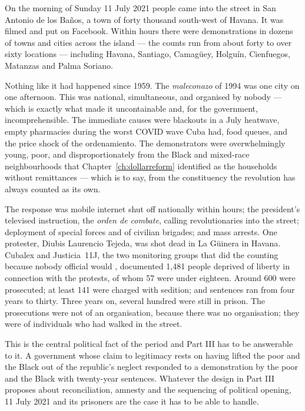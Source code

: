 On the morning of Sunday 11 July 2021 people came into the street in San
Antonio de los Ba\~nos, a town of forty thousand south-west of Havana. It was
filmed and put on Facebook. Within hours there were demonstrations in dozens of
towns and cities across the island --- the counts run from about forty to over
sixty locations --- including Havana, Santiago, Camag\"uey, Holgu\'in,
Cienfuegos, Matanzas and Palma Soriano.\unv{}

Nothing like it had happened since 1959. The \emph{maleconazo} of 1994 was one
city on one afternoon. This was national, simultaneous, and organised by nobody
--- which is exactly what made it uncontainable and, for the government,
incomprehensible. The immediate causes were blackouts in a July heatwave, empty
pharmacies during the worst COVID wave Cuba had, food queues, and the price
shock of the ordenamiento. The demonstrators were overwhelmingly young, poor,
and disproportionately from the Black and mixed-race neighbourhoods that
Chapter~\ref{ch:dollarreform} identified as the households without remittances
--- which is to say, from the constituency the revolution has always counted as
its own.

The response was mobile internet shut off nationally within hours; the
president's televised instruction, the \emph{orden de combate}, calling
revolutionaries into the street; deployment of special forces and of civilian
brigades; and mass arrests. One protester, Diubis Laurencio Tejeda, was shot
dead in La G\"uinera in Havana. Cubalex and Justicia~11J, the two monitoring
groups that did the counting because nobody official would \citep{justicia11j}, documented 1,481
people deprived of liberty in connection with the protests, of whom 57 were
under eighteen. Around 600 were prosecuted; at least 141 were charged with
sedition; and sentences ran from four years to thirty. Three years on, several
hundred were still in prison. The prosecutions were not of an organisation,
because there was no organisation; they were of individuals who had walked in
the street.

This is the central political fact of the period and Part III has to be answerable
to it. A government whose claim to legitimacy rests on having lifted the poor
and the Black out of the republic's neglect responded to a demonstration by the
poor and the Black with twenty-year sentences. Whatever the design in Part III
proposes about reconciliation, amnesty and the sequencing of political opening,
11 July 2021 and its prisoners are the case it has to be able to handle.

